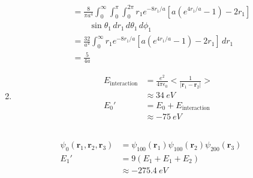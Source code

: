 \documentclass{article}
\renewcommand{\vec}[1]{\boldsymbol{\mathbf{#1}}}
\begin{document}
\begin{enumerate}
\begin{align*}
                                                            & = \frac{8}{\pi a^4} \int_0^\infty \int_0^\pi \int_0^{2 \pi} r_1 e^{-8 r_1 / a} \left[ a \left( e^{4 r_1 / a} - 1 \right) - 2 r_1 \right]                  \\
                                                            & \qquad \sin \theta_1 \,d r_1 \,d \theta_1 \,d \phi_1                                                                                                      \\
                                                            & = \frac{32}{a^4} \int_0^\infty r_1 e^{-8 r_1 / a} \left[ a \left( e^{4 r_1 / a} - 1 \right) - 2 r_1 \right] \,d r_1                                       \\
                                                            & = \frac{5}{4 a}
        \end{align*}

  \item

        \begin{align*}
          E_\text{interaction} & = \frac{e^2}{4 \pi \epsilon_0} \biggl< \frac{1}{|\vec{r}_1 - \vec{r}_2|} \biggr> \\
                               & \approx \qty{34}{eV}                                                             \\
          E_0'                 & = E_0 + E_\text{interaction}                                                     \\
                               & \approx \qty{-75}{eV}
        \end{align*}
\end{enumerate}

\subsection{}

\begin{align*}
  \psi_0(\vec{r}_1, \vec{r}_2, \vec{r}_3) & = \psi_{1 0 0}(\vec{r}_1) \psi_{1 0 0}(\vec{r}_2) \psi_{2 0 0}(\vec{r}_3) \\
  E_1'                                    & = 9 (E_1 + E_1 + E_2)                                                     \\
                                          & \approx \qty{-275.4}{eV}                                                  \\
\end{align*}
\end{document}
